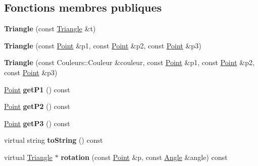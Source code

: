 \subsection*{Fonctions membres publiques}
\begin{DoxyCompactItemize}
\item 
\hypertarget{class_triangle_a96c1681b2b1752c7b4a75bce9c4855ab}{{\bfseries Triangle} (const \hyperlink{class_triangle}{Triangle} \&t)}\label{class_triangle_a96c1681b2b1752c7b4a75bce9c4855ab}

\item 
\hypertarget{class_triangle_a0fdb0e438429946040a288675c43a67f}{{\bfseries Triangle} (const \hyperlink{class_point}{Point} \&p1, const \hyperlink{class_point}{Point} \&p2, const \hyperlink{class_point}{Point} \&p3)}\label{class_triangle_a0fdb0e438429946040a288675c43a67f}

\item 
\hypertarget{class_triangle_a11fbd4b84d3e13385d330b17aec44a77}{{\bfseries Triangle} (const Couleurs\+::\+Couleur \&couleur, const \hyperlink{class_point}{Point} \&p1, const \hyperlink{class_point}{Point} \&p2, const \hyperlink{class_point}{Point} \&p3)}\label{class_triangle_a11fbd4b84d3e13385d330b17aec44a77}

\item 
\hypertarget{class_triangle_abdb0b754dfc0442c5514723d26a4c447}{\hyperlink{class_point}{Point} {\bfseries get\+P1} () const }\label{class_triangle_abdb0b754dfc0442c5514723d26a4c447}

\item 
\hypertarget{class_triangle_a5321f63dbe9adcda3bdf5065695ec7a5}{\hyperlink{class_point}{Point} {\bfseries get\+P2} () const }\label{class_triangle_a5321f63dbe9adcda3bdf5065695ec7a5}

\item 
\hypertarget{class_triangle_aa14eba0138f5250bca2dcc929eea064d}{\hyperlink{class_point}{Point} {\bfseries get\+P3} () const }\label{class_triangle_aa14eba0138f5250bca2dcc929eea064d}

\item 
\hypertarget{class_triangle_a2d989db970abfac992988e46bf615a3a}{virtual string {\bfseries to\+String} () const }\label{class_triangle_a2d989db970abfac992988e46bf615a3a}

\item 
\hypertarget{class_triangle_a32073e547daa9557f2361a9efc06d16a}{virtual \hyperlink{class_triangle}{Triangle} $\ast$ {\bfseries rotation} (const \hyperlink{class_point}{Point} \&p, const \hyperlink{class_angle}{Angle} \&angle) const }\label{class_triangle_a32073e547daa9557f2361a9efc06d16a}


\end{DoxyCompactItemize}
